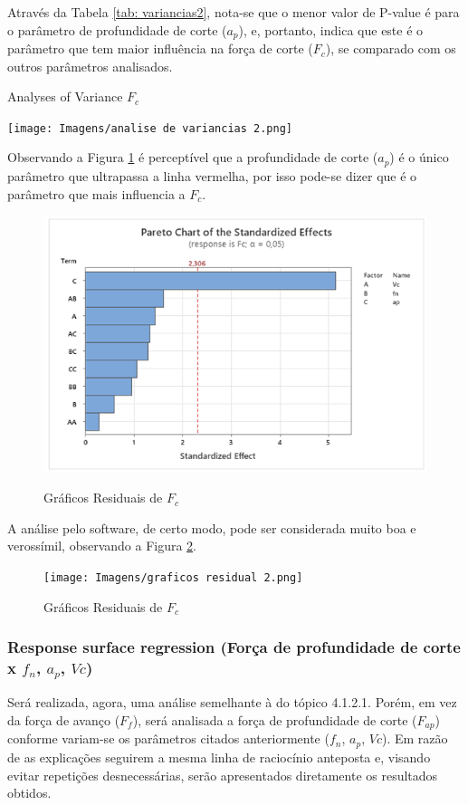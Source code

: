 \documentclass[deposito, acronym, symbols]{fei}
\begin{document}
Através da Tabela \ref{tab: variancias2}, nota-se que o menor valor de P-value é para o parâmetro de profundidade de corte ($a_p$), e, portanto, indica que este é o parâmetro que tem maior influência na força de corte ($F_c$), se comparado com os outros parâmetros analisados.

\begin{table}[!htb]
 \centering
    \caption{Analyses of Variance $F_c$}
    \texttt{[image: Imagens/analise de variancias 2.png]}
    \label{tab: variancias2}
 \end{table}

Observando a Figura \ref{fig:gp2} é perceptível que a profundidade de corte ($a_p$) é o único parâmetro que ultrapassa a linha vermelha, por isso pode-se dizer que é o parâmetro que mais influencia a $F_c$.


\begin{figure}
    \newpage
    \centering
    \caption{Gráficos Residuais de $F_c$}
    \includegraphics[width=0.65\linewidth]{Imagens/gráfico de pareto 2.png}
    \label{fig:gp2}
\end{figure}

A análise pelo software, de certo modo, pode ser considerada muito boa e verossímil, observando a Figura \ref{fig:gr2}.  

\begin{figure}[!htp]
    \centering
    \caption{Gráficos Residuais de $F_c$}
    \texttt{[image: Imagens/graficos residual 2.png]}
    \label{fig:gr2}
\end{figure}

\subsubsection{Response surface regression (Força de profundidade de corte x $f_n$, $a_p$, $Vc$)}

Será realizada, agora, uma análise semelhante à do tópico 4.1.2.1. Porém, em vez da força de avanço ($F_f$), será analisada a força de profundidade de corte ($F_{ap}$) conforme variam-se os parâmetros citados anteriormente ($f_n$, $a_p$, $Vc$). Em razão de as explicações seguirem a mesma linha de raciocínio anteposta e, visando evitar repetições desnecessárias, serão apresentados diretamente os resultados obtidos.
\end{document}
